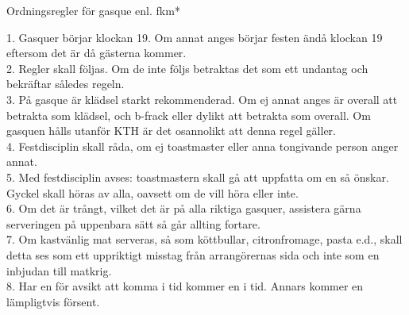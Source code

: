 \documentclass[a6paper,10pt]{article}
\begin{document}
\setlength{\oddsidemargin}{-0.47in}
\begin{center}
\large Ordningsregler för gasque enl. fkm*
\end{center}
\small
1. Gasquer börjar klockan 19. Om annat anges börjar festen ändå klockan 19 eftersom det är då gästerna kommer. \vspace{5pt} \\
2. Regler skall följas. Om de inte följs betraktas det som ett undantag och bekräftar således regeln.
\vspace{5pt} \\
3. På gasque är klädsel starkt rekommenderad. Om ej annat anges är overall att betrakta som klädsel, och b-frack eller dylikt att betrakta som overall. Om gasquen hålls utanför KTH är det osannolikt att denna regel gäller.
\vspace{5pt} \\
4. Festdisciplin skall råda, om ej toastmaster eller anna tongivande person anger annat.
\vspace{5pt} \\
5. Med festdisciplin avses: toastmastern skall gå att uppfatta om en så önskar. Gyckel skall höras av alla, oavsett om de vill höra eller inte.
\vspace{5pt} \\
6. Om det är trångt, vilket det är på alla riktiga gasquer, assistera gärna serveringen på uppenbara sätt så går allting fortare.
\vspace{5pt} \\
7. Om kastvänlig mat serveras, så som köttbullar, citronfromage, pasta e.d., skall detta ses som ett uppriktigt misstag från arrangörernas sida och inte som en inbjudan till matkrig.
\vspace{5pt} \\
8. Har en för avsikt att komma i tid kommer en i tid. Annars kommer en lämpligtvis försent.
\end{document}
